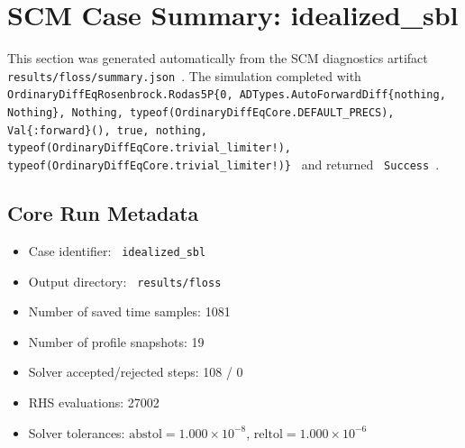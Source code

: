 \section{SCM Case Summary: idealized\_sbl}
\label{sec:scm_case_floss_floss_80x2m_9h_report}

This section was generated automatically from the SCM diagnostics artifact
\texttt{ results/floss/summary.json }. The simulation completed with \texttt{ OrdinaryDiffEqRosenbrock.Rodas5P\{0, ADTypes.AutoForwardDiff\{nothing, Nothing\}, Nothing, typeof(OrdinaryDiffEqCore.DEFAULT\_PRECS), Val\{:forward\}(), true, nothing, typeof(OrdinaryDiffEqCore.trivial\_limiter!), typeof(OrdinaryDiffEqCore.trivial\_limiter!)\} }
and returned \texttt{ Success }.

\subsection{Core Run Metadata}
\begin{itemize}
  \item Case identifier: \texttt{ idealized\_sbl }
  \item Output directory: \texttt{ results/floss }
  \item Number of saved time samples: 1081
  \item Number of profile snapshots: 19
  \item Solver accepted/rejected steps: 108 / 0
  \item RHS evaluations: 27002
  \item Solver tolerances: $\mathrm{abstol}=1.000 \times 10^{-8}$, $\mathrm{reltol}=1.000 \times 10^{-6}$
\end{itemize}

